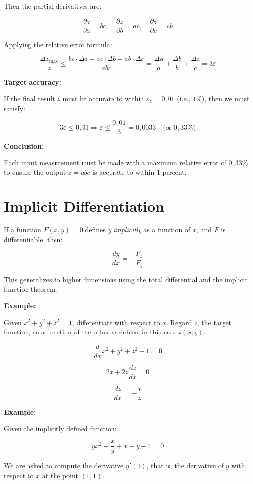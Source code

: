Then the partial derivatives are:

\[
    \frac{\partial z}{\partial a} = b c, \quad
    \frac{\partial z}{\partial b} = a c, \quad
    \frac{\partial z}{\partial c} = a b
\]

Applying the relative error formula:

\[
    \frac{\Delta z_{\max}}{z} \leq \frac{bc \cdot \Delta a + ac \cdot \Delta b + ab \cdot \Delta c}{abc}
    = \frac{\Delta a}{a} + \frac{\Delta b}{b} + \frac{\Delta c}{c} = 3 \varepsilon
\]

\textbf{Target accuracy:}  

If the final result \(z\) must be accurate to within \( \varepsilon_z = 0{,}01 \) (i.e., \(1\%\)), then we must 
satisfy:

\[
    3 \varepsilon \leq 0{,}01 \Rightarrow \varepsilon \leq \frac{0{,}01}{3} = 0,0033 \quad 
    \text{(or } 0,33\% \text{)}
\]

\textbf{Conclusion:}

Each input measurement must be made with a maximum relative error of \( 0,33\% \) to ensure 
the output \( z = abc \) is accurate to within 1 percent.

\section{Implicit Differentiation}

If a function \( F(x, y) = 0 \) defines \(y\) \emph{implicitly} as a function of \(x\), and \(F\) is 
differentiable, then:

\[
    \frac{dy}{dx} = -\frac{F_x}{F_y}
\]

This generalizes to higher dimensions using the total differential and the implicit function theorem.

\textbf{Example:}

Given \(x^2 + y^2 + z^2 = 1\), differentiate with respect to \(x\). 
Regard \(z\), the target function, as a function of the other variables, 
in this case \(z(x,y)\).

\[
    \frac{d}{dx} x^2 + y^2 + z^2  -1 = 0
\]

\[
    2x + 2z \frac{dz}{dx}  = 0
\]

\[
    \frac{dz}{dx} = - \frac{x}{z}
\]

\textbf{Example:}

Given the implicitly defined function:

\[
    y x^2 + \frac{x}{y} + x + y - 4 = 0
\]

We are asked to compute the derivative \( y'(1) \), that is, the derivative of \(y\) 
with respect to \(x\) at the point \( (1, 1) \).

